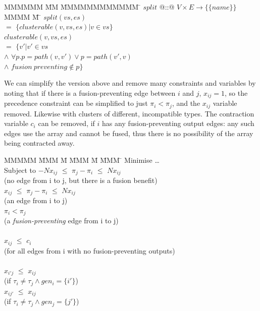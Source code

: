 \begin{tabbing}
MMMMMM      \= MM   \=  MMMMMMMMMMMM    \=  \kill
$split$     \> @::@ \> $V \times E \to \{ \{name\} \}$      \\
MMMM        \= M    \= \kill
$split(vs,es)$ \\
    \> $=$  \> $\{clusterable(v,vs,es) | v \in vs\}$      \\
$clusterable(v,vs,es)$  \\
    \>$=$       \>$\{v' | v' \in vs$                                \\
    \>$\wedge$  \>$\forall p. p = path(v,v') \vee p = path(v',v)$   \\
    \>$\wedge$  \>$fusion~preventing \not\in p\}$\\
\end{tabbing}


We can simplify the version above and remove many constraints and variables by noting that if there is a fusion-preventing edge between $i$ and $j$, $x_{ij} = 1$, so the precedence constraint can be simplified to just $\pi_i < \pi_j$, and the $x_{ij}$ variable removed.
Likewise with clusters of different, incompatible types.
The contraction variable $c_i$ can be removed, if $i$ has any fusion-preventing output edges: any such edges use the array and cannot be fused, thus there is no possibility of the array being contracted away.

\begin{tabbing}
MMMMM   \= MMM \= M \= MMM \= M \= MMM \= \kill
Minimise   \> \ldots \\
Subject to \> $-N x_{ij}$ \> $\le$ \> $\pi_j - \pi_i$ \> $\le$ \> $N x_{ij}$ \\
           \>             (no edge from i to j, but there is a fusion benefit)            \\
           \>    $x_{ij}$ \> $\le$ \> $\pi_j - \pi_i$ \> $\le$ \> $N x_{ij}$ \\
           \>             (an edge from i to j)            \\
           \>             \>       \> $\pi_i < \pi_j$ \>       \>            \\
           \>             (a \emph{fusion-preventing} edge from i to j)            \\
\\
           \> $x_{ij}$    \> $\le$ \> $c_i$           \>       \>            \\
           \> (for all edges from i with no fusion-preventing outputs)      \\
\\
           \> $x_{i'j}$   \> $\le$ \> $x_{ij}$        \>       \>            \\
           \> (if $\tau_i \not= \tau_j \wedge gen_i=\{i'\}$) \\
           \> $x_{ij'}$   \> $\le$ \> $x_{ij}$        \>       \>            \\
           \> (if $\tau_i \not= \tau_j \wedge gen_j=\{j'\}$) \\
\end{tabbing}


